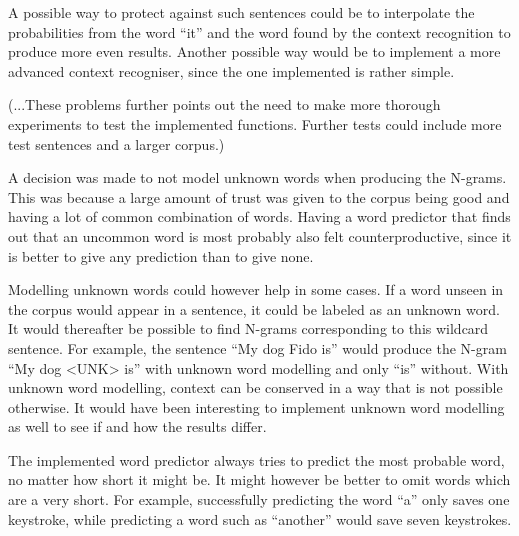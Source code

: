 A possible way to protect against such sentences could be to interpolate the probabilities from the word “it” and the word found by the context recognition to produce more even results. Another possible way would be to implement a more advanced context recogniser, since the one implemented is rather simple.

(...These problems further points out the need to make more thorough experiments to test the implemented functions. Further tests could include more test sentences and a larger corpus.)

A decision was made to not model unknown words when producing the N-grams. This was because a large amount of trust was given to the corpus being good and having a lot of common combination of words. Having a word predictor that finds out that an uncommon word is most probably also felt counterproductive, since it is better to give any prediction than to give none.

Modelling unknown words could however help in some cases. If a word unseen in the corpus would appear in a sentence, it could be labeled as an unknown word. It would thereafter be possible to find N-grams corresponding to this wildcard sentence. For example, the sentence “My dog Fido is” would produce the N-gram “My dog <UNK> is” with unknown word modelling and only “is” without. With unknown word modelling, context can be conserved in a way that is not possible otherwise. It would have been interesting to implement unknown word modelling as well to see if and how the results differ.

The implemented word predictor always tries to predict the most probable word, no matter how short it might be. It might however be better to omit words which are a very short. For example, successfully predicting the word “a” only saves one keystroke, while predicting a word such as “another” would save seven keystrokes.